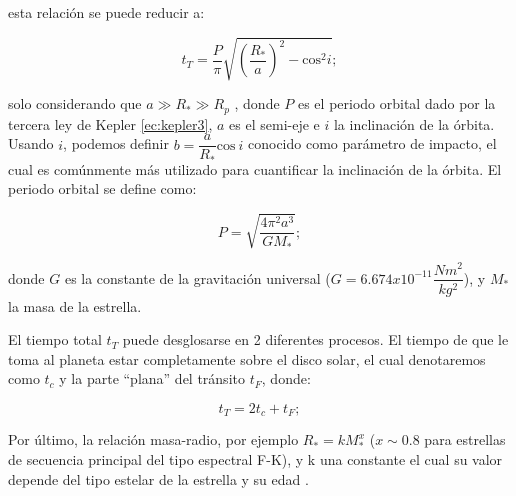 esta relación se puede reducir a:

\begin{equation}
\label{ec:tiempoTransitoReduc}
\displaystyle t_{T}=\dfrac{P}{\pi}\sqrt{\left(\dfrac{R_{*}}{a} \right)^{2}- \mbox{cos}^{2}i};
\end{equation}

solo considerando que $a\gg R_{*}\gg R_{p}$ \citep{winn2010transits}, donde $P$ es el periodo orbital dado por la tercera ley de Kepler \ref{ec:kepler3}, $a$ es el semi-eje e $i$ la inclinación de la órbita. Usando $i$, podemos definir $b=\dfrac{a}{R_{*}}\mbox{cos}~i$ conocido como parámetro de impacto, el cual es comúnmente más utilizado para cuantificar la inclinación de la órbita. El periodo orbital se define como:

\begin{equation}
  \label{ec:kepler3}
  \displaystyle P=\sqrt{\dfrac{4\pi^{2}a^{3}}{GM_{*}}};
  \end{equation} 
  
donde $G$ es la constante de la gravitación universal ($G=6.674x10^{-11}\dfrac{Nm^{2}}{kg^{2}}$), y $M_{*}$ la masa de la estrella.

El tiempo total $t_{T}$ puede desglosarse en 2 diferentes procesos. El tiempo de que le toma al planeta estar completamente sobre el disco solar, el cual denotaremos como $t_{c}$ y la parte ``plana'' del tránsito $t_{F}$, donde:

\begin{equation}
  \label{ec:tiempoTransitoReduc}
  \displaystyle t_{T}=2t_{c}+t_{F};
\end{equation}

Por último, la relación masa-radio, por ejemplo $R_{*}=kM_{*}^{x}$ ($x\sim 0.8$ para estrellas de secuencia principal del tipo espectral F-K), y k una constante el cual su valor depende del tipo estelar de la estrella y su edad \citep{allen2001allen}.

